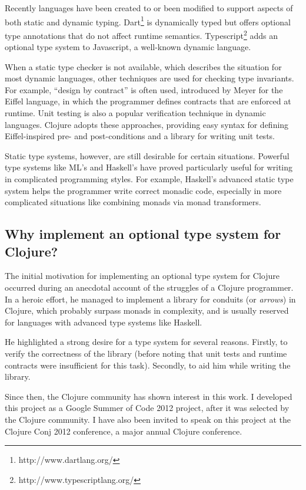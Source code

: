 Recently languages have been created to or been modified to support aspects
of both static and dynamic typing.
Dart\footnote{http://www.dartlang.org/} is dynamically typed but offers optional type annotations
that do not affect runtime semantics. 
Typescript\footnote{http://www.typescriptlang.org/} adds an optional type system to Javascript,
a well-known dynamic language.

When a static type checker is not available, which describes the situation
for most dynamic languages, other techniques are used for checking
type invariants. For example, ``design by contract'' is often used,
introduced by Meyer for the Eiffel language\cite{Mey92},
in which the programmer defines contracts that are enforced at runtime.
Unit testing is also a popular verification technique in dynamic languages.
Clojure adopts these approaches, providing easy syntax for defining 
Eiffel-inspired pre- and post-conditions and a library for writing unit tests.

Static type systems, however, are still desirable for certain situations.
Powerful type systems like ML's\cite{Mil97} and Haskell's\cite{Mar10} have proved particularly useful
for writing in complicated programming styles. For example,
Haskell's advanced static type system helps the programmer write correct monadic code,
especially in more complicated situations like combining monads via monad transformers.

\subsection{Why implement an optional type system for Clojure?}

The initial motivation for implementing an optional type system
for Clojure occurred during an anecdotal account of the struggles
of a Clojure programmer. In a heroic effort, he managed to 
implement a library for conduits (or \emph{arrows}) in Clojure, 
which probably surpass monads in complexity, and is usually reserved
for languages with advanced type systems like Haskell.

He highlighted a strong desire for a type system for several reasons.
Firstly, to verify the correctness
of the library (before noting that unit tests and runtime contracts
were insufficient for this task).
Secondly, to aid him while writing the library.

Since then, the Clojure community has shown interest in this work.
I developed this project as a Google Summer of Code 2012 project,
after it was selected by the Clojure community.
I have also been invited to speak on this project at the Clojure Conj
2012 conference, a major annual Clojure conference.

